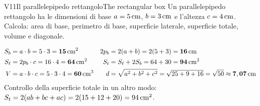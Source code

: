
\newcommand{\scatola}[3]{%
  \coordinate (A) at (0,0); \coordinate (B) at (#1,0); \coordinate (C) at (#1,#3); \coordinate (D) at (0,#3);
  \coordinate (dv) at (40:{0.55*#2});
  \coordinate (A') at ($(A)+(dv)$); \coordinate (B') at ($(B)+(dv)$);
  \coordinate (C') at ($(C)+(dv)$); \coordinate (D') at ($(D)+(dv)$);
  \draw[hidden] (A) -- (A') -- (B') (A') -- (D');
  \draw[side] (A) -- (B) -- (C) -- (D) -- cycle;
  \draw[side] (D) -- (D') -- (C') -- (C);
  \draw[side] (B) -- (B') -- (C');}


\begin{esercizio}{V1}{1}{Il parallelepipedo rettangolo}{The rectangular box}
Un parallelepipedo rettangolo ha le dimensioni di base $a=5\,\mathrm{cm}$, $b=3\,\mathrm{cm}$ e l'altezza $c=4\,\mathrm{cm}$. Calcola: area di base, perimetro di base, superficie laterale, superficie totale, volume e diagonale.
\begin{center}
\end{center}
\end{esercizio}
\begin{solbox}
\begin{align*}
S_b&=a\cdot b=5\cdot3=\mathbf{15\,\mathrm{cm^2}} & 2p_b&=2(a+b)=2(5+3)=\mathbf{16\,\mathrm{cm}}\\
S_\ell&=2p_b\cdot c=16\cdot4=\mathbf{64\,\mathrm{cm^2}} & S_t&=S_\ell+2S_b=64+30=\mathbf{94\,\mathrm{cm^2}}\\
V&=a\cdot b\cdot c=5\cdot3\cdot4=\mathbf{60\,\mathrm{cm^3}} & d&=\sqrt{a^2+b^2+c^2}=\sqrt{25+9+16}=\sqrt{50}\approx\mathbf{7,07\,\mathrm{cm}}
\end{align*}
Controllo della superficie totale in un altro modo: $S_t=2(ab+bc+ac)=2(15+12+20)=94\,\mathrm{cm^2}$. \checkmark
{}
\end{solbox}

